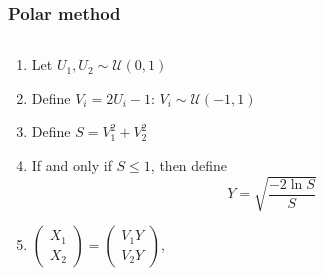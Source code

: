 \documentclass[10pt, serif, mathserif]{beamer}
\begin{document}
\begin{frame}
  \frametitle{Polar method}
  \begin{columns}[t]
    \begin{column}{.6\textwidth}
      \begin{enumerate}
        \item Let $U_1, U_2 \sim \mathcal{U}(0,1)$
        \item Define $V_i = 2U_i - 1$: $V_i \sim \mathcal{U}(-1,1)$
        \item Define $S = V_1^2 + V_2^2$
        \item If and only if $S \leq 1$, then define
          \[ Y = \sqrt{\frac{-2\ln{S}}{S}} \]
        \item 
          $ \left( \begin{matrix} X_1 \\ X_2 \end{matrix} \right) = \left( \begin{matrix} V_1 Y \\ V_2 Y \end{matrix} \right),$
          \medskip


\end{enumerate}
\end{column}
\end{columns}
\end{frame}
\end{document}
